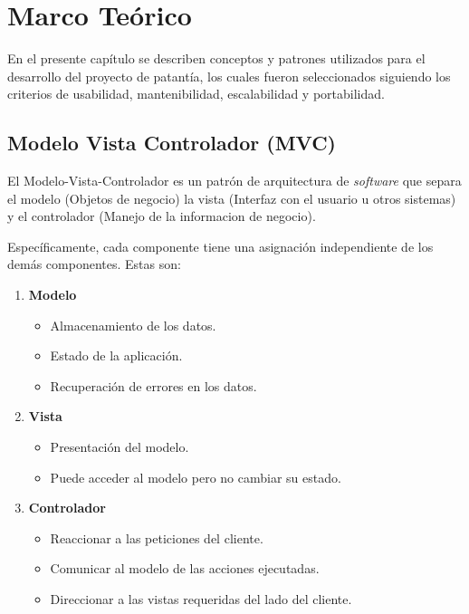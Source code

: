 \chapter{Marco Teórico}

En el presente capítulo se describen conceptos y patrones utilizados para el desarrollo del proyecto de patantía, los cuales fueron seleccionados siguiendo los criterios de usabilidad, mantenibilidad, escalabilidad y portabilidad.

    \section{Modelo Vista Controlador (MVC)}
    
    El Modelo-Vista-Controlador es un patrón de arquitectura de \textit{software} que separa el modelo (Objetos de negocio) la vista (Interfaz con el usuario u otros sistemas) y el controlador (Manejo de la informacion de negocio)\cite{MVC-tiw}.
    
    Específicamente, cada componente tiene una asignación independiente de los demás componentes. Estas son:
    
    \begin{enumerate}
        \item \textbf{Modelo}
            \begin{itemize}
                \item Almacenamiento de los datos.
                \item Estado de la aplicación.
                \item Recuperación de errores en los datos.
            \end{itemize}
        \item \textbf{Vista}
            \begin{itemize}
                \item Presentación del modelo.
                \item Puede acceder al modelo pero no cambiar su estado.
            \end{itemize}
        \item \textbf{Controlador}
            \begin{itemize}
                \item Reaccionar a las peticiones del cliente.
                \item Comunicar al modelo de las acciones ejecutadas.
                \item Direccionar a las vistas requeridas del lado del cliente.
            \end{itemize}
    \end{enumerate}
    
